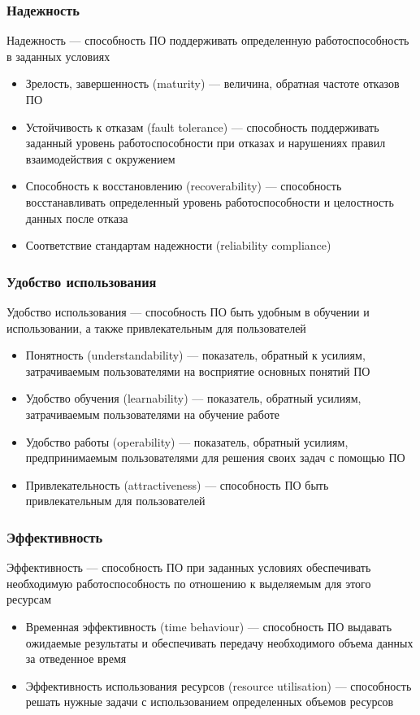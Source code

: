 \documentclass{../industrial-development}
\begin{document}
	\begin{frame} \frametitle {Надежность}
		\begin{block}{}
			\alert{Надежность} ---  способность  ПО  поддерживать  определенную  работоспособность в заданных условиях 
		\end{block}
		\begin{itemize}
			\item Зрелость, завершенность (maturity) --- величина, обратная частоте отказов ПО
			\item Устойчивость к отказам (fault tolerance) --- способность поддерживать заданный уровень работоспособности при отказах и нарушениях правил взаимодействия с окружением
			\item Способность к восстановлению (recoverability) --- способность восстанавливать определенный уровень работоспособности и целостность данных после отказа
			\item Соответствие стандартам надежности (reliability compliance)
		\end{itemize}
	\end{frame}
	
	\begin{frame} \frametitle {Удобство использования}
		\begin{block}{}
			\alert{Удобство использования} --- способность ПО быть удобным в обучении и использовании, а также привлекательным для пользователей 
		\end{block}
		\begin{itemize}
			\item Понятность (understandability) --- показатель, обратный к усилиям, затрачиваемым пользователями на восприятие основных понятий ПО
			\item Удобство обучения (learnability) --- показатель, обратный усилиям, затрачиваемым пользователями на обучение работе
			\item Удобство работы (operability) --- показатель, обратный усилиям, предпринимаемым пользователями для решения своих задач с помощью ПО
			\item Привлекательность (attractiveness) --- способность ПО быть привлекательным для пользователей
		\end{itemize}
	\end{frame}
	
	\begin{frame} \frametitle {Эффективность}
		\begin{block}{}
			\alert{Эффективность} --- способность ПО при заданных условиях обеспечивать необходимую работоспособность по отношению к выделяемым для этого ресурсам
		\end{block}
		\begin{itemize}
			\item Временная эффективность (time behaviour) --- способность ПО выдавать ожидаемые результаты и обеспечивать передачу необходимого объема данных за отведенное время
			\item Эффективность использования ресурсов (resource utilisation) --- способность решать нужные задачи с использованием определенных объемов ресурсов
		\end{itemize}
	\end{frame}
	
\end{document}
